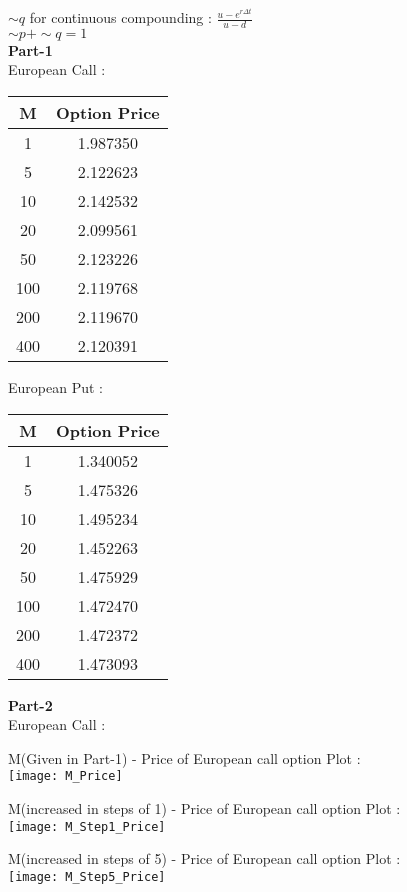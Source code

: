 \documentclass{article}
\begin{document}
$\sim q$ for continuous compounding : $\frac{u - e^{r\Delta t}}{u-d}$\\
$\sim p + \sim q = 1$\\
\textbf{Part-1}\\
European Call :
\begin{center}
\begin{tabular}{ |c|c| } 
 \hline
 M & Option Price\\
 \hline
 1 & 1.987350\\
5 & 2.122623\\
10 & 2.142532\\
20 & 2.099561\\
50 & 2.123226\\
100 & 2.119768\\
200 & 2.119670\\
400 & 2.120391\\
 \hline
\end{tabular}
\end{center}
European Put :
\begin{center}
\begin{tabular}{ |c|c| } 
 \hline
 M & Option Price\\
 \hline
1 & 1.340052\\
5 & 1.475326\\
10 & 1.495234\\
20 & 1.452263\\
50 & 1.475929\\
100 & 1.472470\\
200 & 1.472372\\
400 & 1.473093\\
 \hline
\end{tabular}
\end{center}
\newpage
\textbf{Part-2}\\
European Call :
\begin{center}
M(Given in Part-1) - Price of European call option Plot :\\
\texttt{[image: M\_Price]}
\end{center}

\begin{center}
M(increased in steps of 1) - Price of European call option Plot :\\
\texttt{[image: M\_Step1\_Price]}
\end{center}

\begin{center}
M(increased in steps of 5) - Price of European call option Plot :\\
\texttt{[image: M\_Step5\_Price]}
\end{center}
\end{document}
